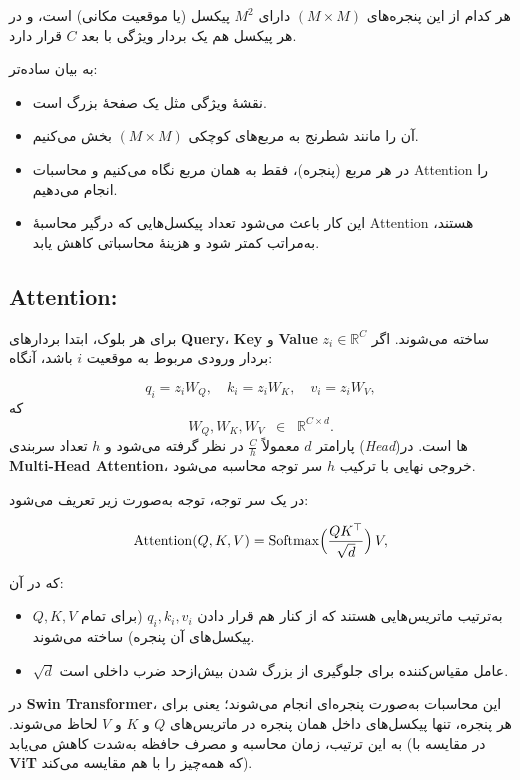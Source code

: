 هر کدام از این پنجره‌های 
\(\displaystyle (M \times M)\) 
دارای 
\(\displaystyle M^2\) پیکسل (یا موقعیت مکانی) است، 
و در هر پیکسل هم یک بردار ویژگی با بعد \(\displaystyle C\) قرار دارد.

به بیان ساده‌تر:
\begin{itemize}
	\item نقشهٔ ویژگی مثل یک صفحهٔ بزرگ است.
	\item آن را مانند شطرنج به مربع‌های کوچکی \(\displaystyle (M \times M)\) بخش می‌کنیم.
	\item در هر مربع (پنجره)، فقط به همان مربع نگاه می‌کنیم و محاسبات Attention را انجام می‌دهیم.
	\item این کار باعث می‌شود تعداد پیکسل‌هایی که درگیر محاسبهٔ Attention هستند، 
	به‌مراتب کمتر شود و هزینهٔ محاسباتی کاهش یابد.
\end{itemize}


\subsection{Attention:}

برای هر بلوک، ابتدا بردارهای \textbf{Query}، \textbf{Key} و \textbf{Value} ساخته می‌شوند. 
اگر \(\displaystyle z_i \in \mathbb{R}^C\) بردار ورودی مربوط به موقعیت \(i\) باشد، آنگاه:

\[
q_i = z_i W_Q, 
\quad
k_i = z_i W_K,
\quad
v_i = z_i W_V,
\]
که 
\[
W_Q, W_K, W_V \;\;\in \;\;\mathbb{R}^{C \times d}.
\]
پارامتر \(\displaystyle d\) معمولاً \(\displaystyle \tfrac{C}{h}\) در نظر گرفته می‌شود 
و \(\displaystyle h\) تعداد سربندی (\textit{Head})ها است. 
در \textbf{Multi-Head Attention}، خروجی نهایی با ترکیب \(\displaystyle h\) سر توجه محاسبه می‌شود.

در یک سر توجه، توجه به‌صورت زیر تعریف می‌شود:

\[
\mathrm{Attention}(Q, K, V)
=
\mathrm{Softmax}\Bigl(\frac{QK^\top}{\sqrt{d}}\Bigr)\,V,
\]

که در آن:

\begin{itemize}
	\item \(\displaystyle Q, K, V\) به‌ترتیب ماتریس‌هایی هستند که از کنار هم قرار دادن 
	\(\displaystyle q_i, k_i, v_i\) (برای تمام پیکسل‌های آن پنجره) ساخته می‌شوند.
	\item \(\displaystyle \sqrt{d}\) عامل مقیاس‌کننده برای جلوگیری از بزرگ شدن بیش‌ازحد ضرب داخلی است.
\end{itemize}

در \textbf{Swin Transformer}، این محاسبات به‌صورت پنجره‌ای انجام می‌شوند؛ یعنی 
برای هر پنجره، تنها پیکسل‌های داخل همان پنجره در ماتریس‌های 
\(\displaystyle Q\) و \(\displaystyle K\) و \(\displaystyle V\) لحاظ می‌شوند. 
به این ترتیب، زمان محاسبه و مصرف حافظه به‌شدت کاهش می‌یابد 
(در مقایسه با \textbf{ViT} که همه‌چیز را با هم مقایسه می‌کند).

